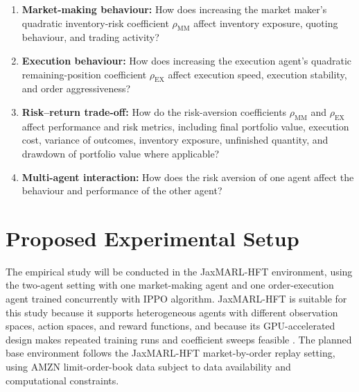 \documentclass[oneside]{uva-inf-bachelor-thesis}
\begin{document}
\begin{enumerate}
    \item \textbf{Market-making behaviour:}
    How does increasing the market maker's quadratic inventory-risk coefficient $\rho_{\mathrm{MM}}$ affect inventory exposure, quoting behaviour, and trading activity?


    \item \textbf{Execution behaviour:}
    How does increasing the execution agent's quadratic remaining-position coefficient $\rho_{\mathrm{EX}}$ affect execution speed, execution stability, and order aggressiveness?


    \item \textbf{Risk--return trade-off:}
    How do the risk-aversion coefficients $\rho_{\mathrm{MM}}$ and $\rho_{\mathrm{EX}}$ affect performance and risk metrics, including final portfolio value, execution cost, variance of outcomes, inventory exposure, unfinished quantity, and drawdown of portfolio value where applicable?

    \item \textbf{Multi-agent interaction:}
    How does the risk aversion of one agent affect the behaviour and performance of the other agent?
\end{enumerate}

\section{Proposed Experimental Setup}

The empirical study will be conducted in the JaxMARL-HFT environment, using the two-agent setting with one market-making agent and one order-execution agent trained concurrently with IPPO algorithm. JaxMARL-HFT is suitable for this study because it supports heterogeneous agents with different observation spaces, action spaces, and reward functions, and because its GPU-accelerated design makes repeated training runs and coefficient sweeps feasible \cite{mohl_jaxmarl-hft_2025}. The planned base environment follows the JaxMARL-HFT market-by-order replay setting, using AMZN limit-order-book data subject to data availability and computational constraints.
\end{document}
